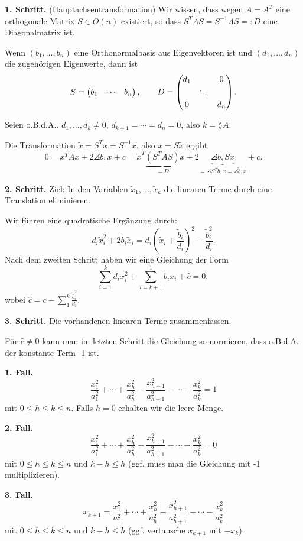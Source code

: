 \documentclass[
 a4paper,
 12pt,
 parskip=half
 ]{scrartcl}
\theoremstyle{plain}
\theoremstyle{definition}
\begin{document}
\textbf{1. Schritt.} (Hauptachsentransformation) Wir wissen, dass wegen $A=A^T$
eine orthogonale Matrix $S \in O(n)$ existiert, so dass $S^T A S = S^{-1} A S =:
D$ eine Diagonalmatrix ist.

Wenn $(b_1, \ldots, b_n)$ eine Orthonormalbasis aus Eigenvektoren ist und $(d_1,
\ldots, d_n)$ die zugehörigen Eigenwerte, dann ist
\[ S = \begin{pmatrix}b_1 & \cdots & b_n\end{pmatrix}, \qquad D = \begin{pmatrix}d_1 & & 0 \\ & \ddots \\ 0 &
    & d_n\end{pmatrix}. \]

Seien o.B.d.A.. $d_1, \ldots, d_k \ne 0$, $d_{k+1} = \cdots = d_n = 0$, also $k
= \rang A$.

Die Transformation $\tilde{x} = S^T x = S^{-1} x$, also $x = S \tilde{x}$ ergibt
\[ 0 = x^T A x + 2 \angles{b,x} + c = \tilde{x}^T \underbrace{(S^T A S)}_{=D}
  \tilde{x} + 2 \underbrace{\angles{b, S \tilde{x}}}_{=\angles{S^T b, \tilde{x}}=\angles{\tilde{b},\tilde{x}}} + c. \]

\textbf{2. Schritt.} Ziel: In den Variablen $\tilde{x}_1, \ldots, \tilde{x}_k$
die linearen Terme durch eine Translation eliminieren.

Wir führen eine quadratische Ergänzung durch:
\[ d_i \tilde{x}_i^2 + 2 \tilde{b}_i \tilde{x}_i = d_i \left( \tilde{x}_i +
    \frac{\tilde{b}_i}{d_i} \right)^2 - \frac{\tilde{b}_i^2}{d_i}. \]
Nach dem zweiten Schritt haben wir eine Gleichung der Form
\[ \sum_{i=1}^k d_i x_i^2 + \sum_{i=k+1}^1 \tilde{b}_i x_i + \hat{c} = 0, \]
wobei $\hat{c} = c - \sum_1^k \frac{\tilde{b}_i^2}{d_i}$.

\textbf{3. Schritt.} Die vorhandenen linearen Terme zusammenfassen.

Für $\hat{c} \ne 0$ kann man im letzten Schritt die Gleichung so normieren, dass
o.B.d.A. der konstante Term -1 ist.

\textbf{1. Fall.}
\[ \frac{x_1^2}{a_1^2} + \cdots + \frac{x_h^2}{a_h^2} -
  \frac{x_{h+1}^2}{a_{h+1}^2} - \cdots - \frac{x_k^2}{a_k^2} = 1 \]
mit $0 \le h \le k \le n$. Falls $h = 0$ erhalten wir die leere Menge.

\textbf{2. Fall.}
\[ \frac{x_1^2}{a_1^2} + \cdots + \frac{x_h^2}{a_h^2} -
  \frac{x_{h+1}^2}{a_{h+1}^2} - \cdots - \frac{x_k^2}{a_k^2} = 0 \]
mit $0 \le h \le k \le n$ und $k-h \le h$ (ggf. muss man die Gleichung mit -1
multiplizieren).

\textbf{3. Fall.}
\[ x_{k+1} = \frac{x_1^2}{a_1^2} + \cdots + \frac{x_h^2}{a_h^2} -
  \frac{x_{h+1}^2}{a_{h+1}^2} - \cdots - \frac{x_k^2}{a_k^2} \]
mit $0 \le h \le k \le n$ und $k-h \le h$ (ggf. vertausche $x_{k+1}$ mit $-x_k$).
\end{document}
